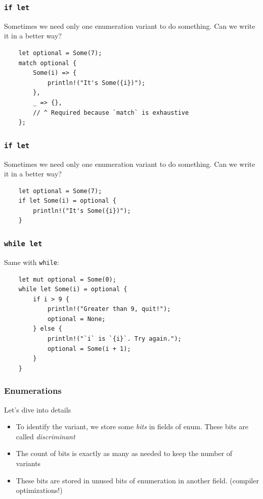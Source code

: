 \documentclass[aspectratio=1610,t]{beamer}
\begin{document}

\begin{frame}[fragile]
\frametitle{\texttt{if let}}
Sometimes we need only one enumeration variant to do something. Can we write it in a better way?

\begin{verbatim}
    let optional = Some(7);
    match optional {
        Some(i) => {
            println!("It's Some({i})");
        },
        _ => {},
        // ^ Required because `match` is exhaustive
    };
\end{verbatim}
\end{frame}


\begin{frame}[fragile]
\frametitle{\texttt{if let}}
Sometimes we need only one enumeration variant to do something. Can we write it in a better way?

\begin{verbatim}
    let optional = Some(7);
    if let Some(i) = optional {
        println!("It's Some({i})");
    }
\end{verbatim}
\end{frame}


\begin{frame}[fragile]
\frametitle{\texttt{while let}}
Same with \texttt{while}:

\begin{verbatim}
    let mut optional = Some(0);
    while let Some(i) = optional {
        if i > 9 {
            println!("Greater than 9, quit!");
            optional = None;
        } else {
            println!("`i` is `{i}`. Try again.");
            optional = Some(i + 1);
        }
    }
\end{verbatim}
\end{frame}


\begin{frame}[fragile]
\frametitle{Enumerations}
Let's dive into details

\begin{itemize}
    \item To identify the variant, we store some \textit{bits} in fields of enum. These bits are called \textit{discriminant}
    \item The count of bits is exactly as many as needed to keep the number of variants
    \item These bits are stored in unused bits of enumeration in another field. (compiler optimizations!)
\end{itemize}
\end{frame}
\end{document}
